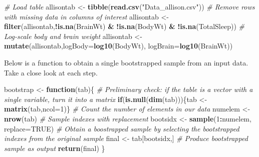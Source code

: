 \documentclass[
]{book}
\newenvironment{Shaded}{\begin{snugshade}}{\end{snugshade}}
\newcommand{\CommentTok}[1]{\textcolor[rgb]{0.56,0.35,0.01}{\textit{#1}}}
\newcommand{\ControlFlowTok}[1]{\textcolor[rgb]{0.13,0.29,0.53}{\textbf{#1}}}
\newcommand{\DataTypeTok}[1]{\textcolor[rgb]{0.13,0.29,0.53}{#1}}
\newcommand{\DecValTok}[1]{\textcolor[rgb]{0.00,0.00,0.81}{#1}}
\newcommand{\KeywordTok}[1]{\textcolor[rgb]{0.13,0.29,0.53}{\textbf{#1}}}
\newcommand{\NormalTok}[1]{#1}
\newcommand{\OperatorTok}[1]{\textcolor[rgb]{0.81,0.36,0.00}{\textbf{#1}}}
\newcommand{\OtherTok}[1]{\textcolor[rgb]{0.56,0.35,0.01}{#1}}
\newcommand{\StringTok}[1]{\textcolor[rgb]{0.31,0.60,0.02}{#1}}
\begin{document}
\begin{Shaded}
\begin{Highlighting}[]
\CommentTok{\# Load table}
\NormalTok{allisontab \textless{}{-}}\StringTok{ }\KeywordTok{tibble}\NormalTok{(}\KeywordTok{read.csv}\NormalTok{(}\StringTok{"Data\_allison.csv"}\NormalTok{))}
\CommentTok{\# Remove rows with missing data in columns of interest }
\NormalTok{allisontab \textless{}{-}}\StringTok{ }\KeywordTok{filter}\NormalTok{(allisontab,}\OperatorTok{!}\KeywordTok{is.na}\NormalTok{(BrainWt) }\OperatorTok{\&}\StringTok{ }\OperatorTok{!}\KeywordTok{is.na}\NormalTok{(BodyWt) }\OperatorTok{\&}\StringTok{ }\OperatorTok{!}\KeywordTok{is.na}\NormalTok{(TotalSleep))}
\CommentTok{\# Log{-}scale body and brain weight}
\NormalTok{allisontab \textless{}{-}}\StringTok{ }\KeywordTok{mutate}\NormalTok{(allisontab,}\DataTypeTok{logBody=}\KeywordTok{log10}\NormalTok{(BodyWt), }\DataTypeTok{logBrain=}\KeywordTok{log10}\NormalTok{(BrainWt))}
\end{Highlighting}
\end{Shaded}

Below is a function to obtain a single bootstrapped sample from an input data. Take a close look at each step.

\begin{Shaded}
\begin{Highlighting}[]
\NormalTok{bootstrap \textless{}{-}}\StringTok{ }\ControlFlowTok{function}\NormalTok{(tab)\{}
  \CommentTok{\# Preliminary check: if the table is a vector with a single variable, turn it into a matrix}
  \ControlFlowTok{if}\NormalTok{(}\KeywordTok{is.null}\NormalTok{(}\KeywordTok{dim}\NormalTok{(tab)))\{tab \textless{}{-}}\StringTok{ }\KeywordTok{matrix}\NormalTok{(tab,}\DataTypeTok{ncol=}\DecValTok{1}\NormalTok{)\}}
  \CommentTok{\# Count the number of elements in our data}
\NormalTok{  numelem \textless{}{-}}\StringTok{ }\KeywordTok{nrow}\NormalTok{(tab)}
  \CommentTok{\# Sample indexes with replacement}
\NormalTok{  bootsidx \textless{}{-}}\StringTok{ }\KeywordTok{sample}\NormalTok{(}\DecValTok{1}\OperatorTok{:}\NormalTok{numelem, }\DataTypeTok{replace=}\OtherTok{TRUE}\NormalTok{)}
  \CommentTok{\# Obtain a boostrapped sample by selecting the bootstrapped indexes from the original sample}
\NormalTok{  final \textless{}{-}}\StringTok{ }\NormalTok{tab[bootsidx,]}
  \CommentTok{\# Produce bootstrapped sample as output}
  \KeywordTok{return}\NormalTok{(final)}
\NormalTok{\}}
\end{Highlighting}
\end{Shaded}
\end{document}
